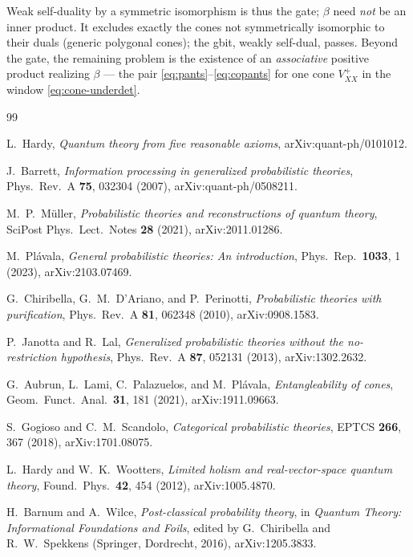\documentclass[prl,aps,10pt,superscriptaddress, floatfix]{revtex4-2}
\begin{document}
Weak self-duality by a symmetric isomorphism is thus the gate; $\beta$ need \emph{not} be an inner product. It excludes exactly the cones not symmetrically isomorphic to their duals (generic polygonal cones); the gbit, weakly self-dual, passes. Beyond the gate, the remaining problem is the existence of an \emph{associative} positive product realizing $\beta$ --- the pair \eqref{eq:pants}--\eqref{eq:copants} for one cone $V^+_{XX}$ in the window \eqref{eq:cone-underdet}.

\begin{thebibliography}{99}

L.~Hardy,
\emph{Quantum theory from five reasonable axioms},
arXiv:quant-ph/0101012.

J.~Barrett,
\emph{Information processing in generalized probabilistic theories},
Phys.\ Rev.\ A \textbf{75}, 032304 (2007),
arXiv:quant-ph/0508211.

M.~P.~M\"uller,
\emph{Probabilistic theories and reconstructions of quantum theory},
SciPost Phys.\ Lect.\ Notes \textbf{28} (2021),
arXiv:2011.01286.

M.~Pl\'avala,
\emph{General probabilistic theories: An introduction},
Phys.\ Rep.\ \textbf{1033}, 1 (2023),
arXiv:2103.07469.

G.~Chiribella, G.~M.~D'Ariano, and P.~Perinotti,
\emph{Probabilistic theories with purification},
Phys.\ Rev.\ A \textbf{81}, 062348 (2010),
arXiv:0908.1583.

P.~Janotta and R.~Lal,
\emph{Generalized probabilistic theories without the no-restriction hypothesis},
Phys.\ Rev.\ A \textbf{87}, 052131 (2013),
arXiv:1302.2632.

G.~Aubrun, L.~Lami, C.~Palazuelos, and M.~Pl\'avala,
\emph{Entangleability of cones},
Geom.\ Funct.\ Anal.\ \textbf{31}, 181 (2021),
arXiv:1911.09663.

S.~Gogioso and C.~M.~Scandolo,
\emph{Categorical probabilistic theories},
EPTCS \textbf{266}, 367 (2018),
arXiv:1701.08075.

L.~Hardy and W.~K.~Wootters,
\emph{Limited holism and real-vector-space quantum theory},
Found.\ Phys.\ \textbf{42}, 454 (2012),
arXiv:1005.4870.

H.~Barnum and A.~Wilce,
\emph{Post-classical probability theory},
in \emph{Quantum Theory: Informational Foundations and Foils},
edited by G.~Chiribella and R.~W.~Spekkens (Springer, Dordrecht, 2016),
arXiv:1205.3833.


\end{thebibliography}
\end{document}
